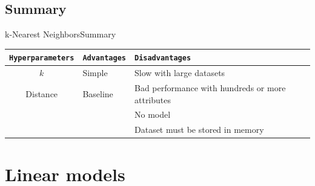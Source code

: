 \documentclass[10pt,compress]{beamer} %
\begin{document}
\subsection{Summary}
\begin{frame}{k-Nearest Neighbors}{Summary}
	\begin{center}
	\begin{tabular}{cp{3cm}p{3cm}}\hline
	 	\texttt{Hyperparameters}  & \texttt{Advantages}  & \texttt{Disadvantages} \\\hline
	 	$k$                       & Simple               & Slow with large datasets  \\
	 	Distance                  & Baseline             & Bad performance with hundreds or more attributes  \\
                                  &                      & No model \\
                                  &                      & Dataset must be stored in memory \\
	 	\hline
	\end{tabular}
	\end{center}
\end{frame}



\section{Linear models}
\end{document}

